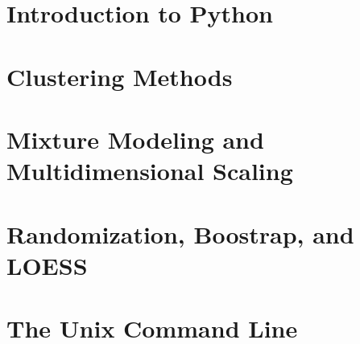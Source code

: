 \documentclass[10pt,oneside,bigheadings,tablecaptionabove]{scrbook}
\begin{document}
\chapter{Introduction to Python}


\chapter{Clustering Methods}


\chapter{Mixture Modeling and Multidimensional Scaling}


\chapter{Randomization, Boostrap, and LOESS}


% 

% 

% 

\appendix
\chapter{The Unix Command Line}



%
%
% 
% 
\end{document}
